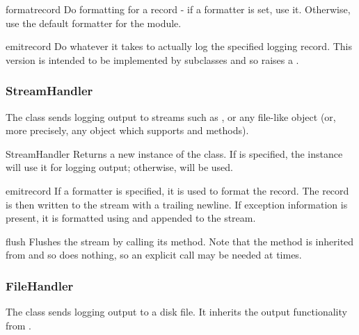 \begin{methoddesc}{format}{record}
Do formatting for a record - if a formatter is set, use it.
Otherwise, use the default formatter for the module.
\end{methoddesc}

\begin{methoddesc}{emit}{record}
Do whatever it takes to actually log the specified logging record.
This version is intended to be implemented by subclasses and so
raises a .
\end{methoddesc}

\subsubsection{StreamHandler}

The  class sends logging output to streams such as
,  or any file-like object (or, more
precisely, any object which supports  and 
methods).

\begin{classdesc}{StreamHandler}{}
Returns a new instance of the  class. If  is
specified, the instance will use it for logging output; otherwise,
 will be used.
\end{classdesc}

\begin{methoddesc}{emit}{record}
If a formatter is specified, it is used to format the record.
The record is then written to the stream with a trailing newline.
If exception information is present, it is formatted using
 and appended to the stream.
\end{methoddesc}

\begin{methoddesc}{flush}{}
Flushes the stream by calling its  method. Note that
the  method is inherited from  and
so does nothing, so an explicit  call may be needed
at times.
\end{methoddesc}

\subsubsection{FileHandler}

The  class sends logging output to a disk file.
It inherits the output functionality from .

